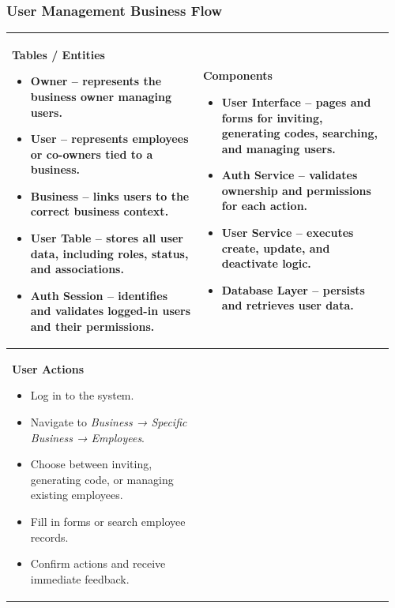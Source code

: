 \documentclass[]{VUMIFTemplateClass}
\newenvironment{mpitemlist}[1][\linewidth]{%
    \begin{minipage}[t]{#1}%
        \setlength{\leftmargini}{12pt}%
        \begin{itemize}%
            \setlength{\itemsep}{1pt}%
            \setlength{\parskip}{0pt}%
            \setlength{\parsep}{0pt}%
}{%
        \end{itemize}%
    \end{minipage}\newline
}
\begin{document}
\newpage
\subsubsection{User Management Business Flow}

\begin{center}
\setlength{\tabcolsep}{8pt}
\renewcommand{\arraystretch}{1.3}
\begin{tabular}{|p{0.48\linewidth}|p{0.48\linewidth}|}
\hline
\textbf{Tables / Entities} \newline
\begin{mpitemlist}
\item \textbf{Owner} – represents the business owner managing users.
\item \textbf{User} – represents employees or co-owners tied to a business.
\item \textbf{Business} – links users to the correct business context.
\item \textbf{User Table} – stores all user data, including roles, status, and associations.
\item \textbf{Auth Session} – identifies and validates logged-in users and their permissions.
\end{mpitemlist}
&
\textbf{Components} \newline
\begin{mpitemlist}
\item \textbf{User Interface} – pages and forms for inviting, generating codes, searching, and managing users.
\item \textbf{Auth Service} – validates ownership and permissions for each action.
\item \textbf{User Service} – executes create, update, and deactivate logic.
\item \textbf{Database Layer} – persists and retrieves user data.
\end{mpitemlist}
\\ \hline
\textbf{User Actions} \newline
\begin{mpitemlist}
\item Log in to the system.
\item Navigate to \textit{Business → Specific Business → Employees}.
\item Choose between inviting, generating code, or managing existing employees.
\item Fill in forms or search employee records.
\item Confirm actions and receive immediate feedback.

\end{mpitemlist}
\end{tabular}
\end{center}
\end{document}
